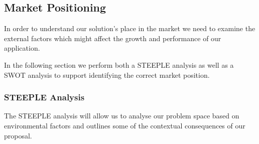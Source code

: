\subsection{Market Positioning}
In order to understand our solution's place in the market we need to examine the external factors which might affect the growth and performance of our application.

In the following section we perform both a STEEPLE \cite{bowman_1998} analysis as well as a SWOT \cite{panagiotou_2003} analysis to support identifying the correct market position.

\subsubsection{STEEPLE Analysis}
The STEEPLE analysis will allow us to analyse our problem space based on environmental factors and outlines some of the contextual consequences of our proposal.
\medskip

